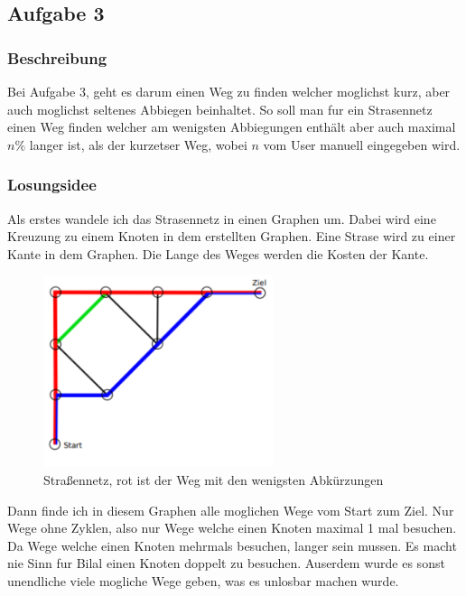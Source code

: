 \documentclass[a4paper,12pt,arial]{scrartcl}
\begin{document}
\subsection{Aufgabe 3}
\subsubsection{Beschreibung}
Bei Aufgabe 3, geht es darum einen Weg zu finden welcher moglichst kurz, aber auch moglichst seltenes Abbiegen beinhaltet.
So soll man fur ein Strasennetz einen Weg finden welcher am wenigsten Abbiegungen enthält aber auch maximal $n\%$ langer ist, als der kurzetser Weg, wobei $n$ vom User manuell eingegeben wird.
\textcite{bwinfSpielfeld}


\subsubsection{Losungsidee}
Als erstes wandele ich das Strasennetz in einen Graphen um.
Dabei wird eine Kreuzung zu einem Knoten in dem erstellten Graphen.
Eine Strase wird zu einer Kante in dem Graphen.
Die Lange des Weges werden die Kosten der Kante.


\begin{figure}[h!]
    \centering
    \includegraphics[width=0.6\textwidth]{aufgabe3.pdf}
    \caption{Straßennetz, rot ist der Weg mit den wenigsten Abkürzungen}
    \label{fig:abbiegen}
\end{figure}

\par
Dann finde ich in diesem Graphen alle moglichen Wege vom Start zum Ziel.
Nur Wege ohne Zyklen, also nur Wege welche einen Knoten maximal 1 mal besuchen. Da Wege welche einen Knoten mehrmals besuchen, langer sein mussen.
Es macht nie Sinn fur Bilal einen Knoten doppelt zu besuchen.
Auserdem wurde es sonst unendliche viele mogliche Wege geben, was es unlosbar machen wurde.
\end{document}

